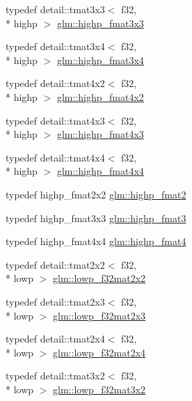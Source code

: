 \begin{DoxyCompactItemize}
\item 
typedef detail\-::tmat3x3$<$ f32, \\*
highp $>$ \hyperlink{group__gtc__type__precision_gaf1d697243b1de74a5769c49e68b1e2a6}{glm\-::highp\-\_\-fmat3x3}
\item 
typedef detail\-::tmat3x4$<$ f32, \\*
highp $>$ \hyperlink{group__gtc__type__precision_ga1f377a3da21dd6c418ec3a5119a4514a}{glm\-::highp\-\_\-fmat3x4}
\item 
typedef detail\-::tmat4x2$<$ f32, \\*
highp $>$ \hyperlink{group__gtc__type__precision_gab3d688f05a884be93c647bce2d8a46f4}{glm\-::highp\-\_\-fmat4x2}
\item 
typedef detail\-::tmat4x3$<$ f32, \\*
highp $>$ \hyperlink{group__gtc__type__precision_ga07f7578fc5a4dd8cdd8a532db25d535f}{glm\-::highp\-\_\-fmat4x3}
\item 
typedef detail\-::tmat4x4$<$ f32, \\*
highp $>$ \hyperlink{group__gtc__type__precision_gaf0a98d6caffce89da963d3430e05ddb0}{glm\-::highp\-\_\-fmat4x4}
\item 
typedef highp\-\_\-fmat2x2 \hyperlink{group__gtc__type__precision_ga10d47be18a81c111a8706d0a6df5b4ea}{glm\-::highp\-\_\-fmat2}
\item 
typedef highp\-\_\-fmat3x3 \hyperlink{group__gtc__type__precision_ga3ff9af2eba26aa6df92aa73e1083e81e}{glm\-::highp\-\_\-fmat3}
\item 
typedef highp\-\_\-fmat4x4 \hyperlink{group__gtc__type__precision_ga4c7c9823ade7c29e29b5a313949ae502}{glm\-::highp\-\_\-fmat4}
\item 
typedef detail\-::tmat2x2$<$ f32, \\*
lowp $>$ \hyperlink{group__gtc__type__precision_gae5beaa9212ba199167c7c7088a70b2bd}{glm\-::lowp\-\_\-f32mat2x2}
\item 
typedef detail\-::tmat2x3$<$ f32, \\*
lowp $>$ \hyperlink{group__gtc__type__precision_ga7e45acb54ae2e4f5113a05b08eea5812}{glm\-::lowp\-\_\-f32mat2x3}
\item 
typedef detail\-::tmat2x4$<$ f32, \\*
lowp $>$ \hyperlink{group__gtc__type__precision_gae0da8e4239df703d44875b49a900c893}{glm\-::lowp\-\_\-f32mat2x4}
\item 
typedef detail\-::tmat3x2$<$ f32, \\*
lowp $>$ \hyperlink{group__gtc__type__precision_gadf8ee4630e8d2b6ae72293a7c8dff497}{glm\-::lowp\-\_\-f32mat3x2}

\end{DoxyCompactItemize}
